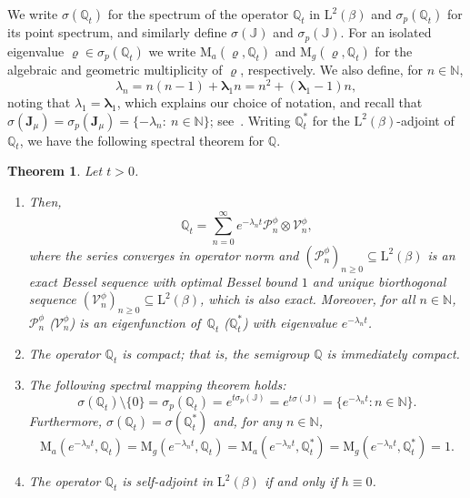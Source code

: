 \documentclass[10pt]{amsart}
\theoremstyle{plain}
\newtheorem{theorem}{Theorem}[section]
\theoremstyle{definition}
\newcommand{\N}{\mathbb{N}}
\renewcommand{\P}{\mathcal{P}}
\newcommand{\V}{\mathcal{V}}
\newcommand{\J}{\mathds{Q}}
\newcommand{\calJ}{\mathds{J}}
\newcommand{\Leb}{\mathrm{L}}
\newcommand{\calJd}{\mathbf{J}}
\newcommand{\lam}{{\bm{\lambda}_1}}
\let\mo\mu
\let\bpsi\beta
\begin{document}
We write $\sigma(\J_t)$ for the spectrum of the operator $\J_t$ in $\Leb^2(\bpsi)$ and $\sigma_p(\J_t)$ for its point spectrum, and similarly define $\sigma(\calJ)$ and $\sigma_p(\calJ)$. For an isolated eigenvalue $\varrho \in \sigma_p(\J_t)$ we write $\mathrm{M}_a(\varrho,\J_t)$ and $\mathrm{M}_g(\varrho,\J_t)$ for the algebraic and geometric multiplicity of $\varrho$, respectively. We also define, for $n \in \N$,
\begin{equation}
\label{eq:def-lambda-n}
\lambda_{n} = n(n-1)+\lam n = n^2+(\lam-1)n,
\end{equation}
noting that $\lambda_{1} = \lam$, which explains our choice of notation, and recall that $\sigma(\calJd_\mo) = \sigma_p(\calJd_\mo) = \{-\lambda_n: \ n \in \N\}$; see~. Writing $\J_t^*$ for the $\Leb^2(\bpsi)$-adjoint of $\J_t$, we have the following spectral theorem for $\J$.


\begin{theorem}
\label{thm:spectral-representation} Let $t > 0$.
\begin{enumerate}
\item \label{item-1:thm:spectral-representation} Then,
\begin{equation*}
\J_t = \sum_{n=0}^{\infty} e^{-\lambda_n t} \P_n^\phi \otimes \V_n^\phi,
\end{equation*}
where the series converges in operator norm and $(\P_n^\phi)_{n \geq 0} \subseteq \Leb^2(\bpsi)$ is an exact Bessel sequence with optimal Bessel bound $1$ and unique biorthogonal sequence $(\V_n^\phi)_{n \geq 0} \subseteq \Leb^2(\bpsi)$, which is also exact. Moreover, for all $n \in \N$, $\P_n^\phi$ ($\V_n^\phi$) is an eigenfunction of~$\J_t$ ($\J_t^*$) with eigenvalue $e^{-\lambda_n t}$.
\item \label{item-2:thm:spectral-representation} {The operator $\J_t$ is compact; that is, the semigroup $\J$ is immediately compact.}
\item \label{item-3:thm:spectral-representation} The following spectral mapping theorem holds:
\begin{equation*}
\sigma(\J_t) \setminus \{0\} = \sigma_p(\J_t) = e^{t\sigma_p(\calJ)} = e^{t\sigma(\calJ)} =\bigl\lbrace e^{-\lambda_n t} : n \in \N \bigr\rbrace.
\end{equation*}
Furthermore, $\sigma(\J_t) = \sigma(\J_t^*)$ and, for any $n \in \N$,
\begin{equation*}
\mathrm{M}_a(e^{-\lambda_n t},\J_t) = \mathrm{M}_g(e^{-\lambda_n t},\J_t) = \mathrm{M}_a(e^{-\lambda_n t},\J_t^*) = \mathrm{M}_g(e^{-\lambda_n t},\J_t^*) = 1.
\end{equation*}
\item \label{item-4:thm:spectral-representation} The operator $\J_t$ is self-adjoint in $\Leb^2(\bpsi)$ if and only if $h \equiv 0$.
\end{enumerate}
\end{theorem}
\end{document}
